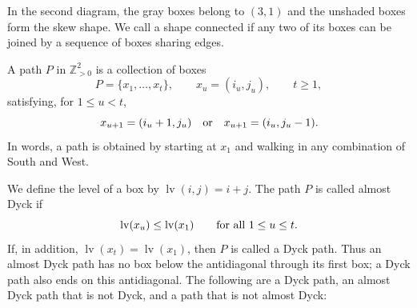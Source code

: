 \documentclass[12pt]{amsart}
\newcommand{\defi}[1]{{\upshape\sffamily #1}}
\theoremstyle{definition}
\numberwithin{equation}{section}
\begin{document}
\medskip 

\noindent In the second diagram, the gray
boxes belong to $(3,1)$ and the unshaded boxes form the skew shape. We call a shape
\defi{connected} if any two of its boxes can be joined by a sequence
of boxes sharing edges. 

A \defi{path} $P$ in $\mathbb Z_{>0}^2$ is a collection of boxes
\[
 P=\{x_1,\ldots,x_t\},\qquad x_u=(i_u,j_u),\qquad t\geq1,
\]
satisfying, for $1\leq u<t$,
\[
 x_{u+1}=(i_u+1,j_u)\quad\textnormal{or}\quad
 x_{u+1}=(i_u,j_u-1).
\]
In words, a path is obtained by starting at $x_1$ and
walking in any combination of South and West. 

We define the \defi{level} of a box by
$\operatorname{lv}(i,j)=i+j$.
The path $P$ is called \defi{almost Dyck} if
\begin{equation}\label{eq:sh-almost-dyck}
 \operatorname{lv}(x_u)\leq\operatorname{lv}(x_1)
 \qquad\textnormal{for all }1\leq u\leq t.
\end{equation}
If, in addition, $\operatorname{lv}(x_t)=\operatorname{lv}(x_1)$,
then $P$ is called a \defi{Dyck path}. Thus an almost Dyck path
has no box below the antidiagonal through its first box; a Dyck
path also ends on this antidiagonal.
The following are a Dyck path, an almost Dyck path that is not
Dyck, and a path that is not almost Dyck:\\
\end{document}
